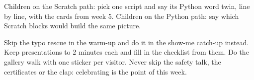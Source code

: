 \begin{stretchchallenge}
Children on the Scratch path: pick one script and say its Python word twin, line by line, with the cards from week 5. Children on the Python path: say which Scratch blocks would build the same picture.
\end{stretchchallenge}

\begin{teachernote}
Skip the typo rescue in the warm-up and do it in the show-me catch-up instead. Keep presentations to 2 minutes each and fill in the checklist from them. Do the gallery walk with one sticker per visitor. Never skip the safety talk, the certificates or the clap: celebrating is the point of this week.
\end{teachernote}
